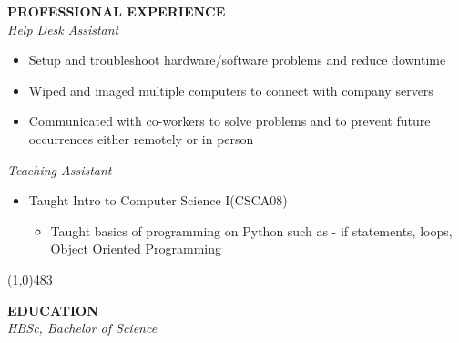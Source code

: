 \documentclass[10pt,oneside]{article}
\begin{document}
        
        \large{\textbf{PROFESSIONAL EXPERIENCE}}\\
        \makebox[\textwidth][c]{}%
        \textit{Help Desk Assistant}
        \begin{itemize}
            \item Setup and troubleshoot hardware/software problems and reduce downtime
            \item Wiped and imaged multiple computers to connect with company servers
            \item Communicated with co-workers to solve problems and to prevent future occurrences either remotely or in person
        \end{itemize}
        \makebox[\textwidth][c]{}%
        \textit{Teaching Assistant}
        \begin{itemize}
            \item Taught Intro to Computer Science I(CSCA08)
            \begin{itemize}
                \item Taught basics of programming on Python such as - if statements, loops, Object Oriented Programming
            \end{itemize}
        \end{itemize}
        \line(1,0){483}
        
        
        \large{\textbf{EDUCATION}}\\
        \makebox[\textwidth][c]{}%
        \textit{ HBSc, Bachelor of Science}
    
\end{document}
